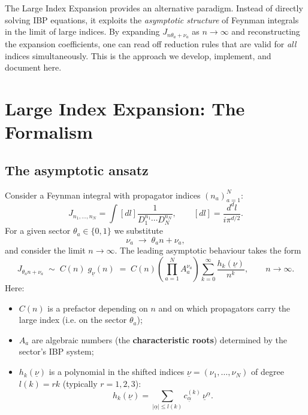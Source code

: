 \documentclass[12pt]{article}
\begin{document}
The Large Index Expansion provides an alternative paradigm.  Instead of directly
solving IBP equations, it exploits the \emph{asymptotic structure} of Feynman integrals
in the limit of large indices.  By expanding $J_{n\theta_a+\nu_a}$ as $n\to\infty$ and
reconstructing the expansion coefficients, one can read off reduction rules that are
valid for \emph{all} indices simultaneously.  This is the approach we develop,
implement, and document here.

\section{Large Index Expansion: The Formalism}\label{sec:formalism}

\subsection{The asymptotic ansatz}

Consider a Feynman integral with propagator indices $(n_a)_{a=1}^N$:
\[
  J_{n_1,\ldots,n_N}
  = \int [dl] \frac{1}{D_1^{n_1}\cdots D_N^{n_N}},
  \qquad [dl]=\frac{d^d l}{i\pi^{d/2}} .
\]
For a given sector $\theta_a\in\{0,1\}$ we substitute
\[
  \nu_a \;\to\; \theta_a n + \nu_a ,
\]
and consider the limit $n\to\infty$.  The leading asymptotic behaviour takes the form
\[
  J_{\theta_a n+\nu_a}
  \;\sim\; C(n)\;g_{\underline{\nu}}(n)
  \;=\; C(n)\!\left(\prod_{a=1}^{N}A_a^{\nu_a}\right)
     \sum_{k=0}^{\infty}\frac{h_k(\underline{\nu})}{n^{k}},
  \qquad n\to\infty .
\tag{2.1}\label{eq:ansatz}
\]
Here:
\begin{itemize}
  \item $C(n)$ is a prefactor depending on $n$ and on which propagators carry
        the large index (i.e. on the sector $\theta_a$);
  \item $A_a$ are algebraic numbers (the \textbf{characteristic roots}) determined by
        the sector's IBP system;
  \item $h_k(\underline{\nu})$ is a polynomial in the shifted indices
        $\underline{\nu}=(\nu_1,\ldots,\nu_N)$ of degree $l(k)=rk$
        (typically $r=1,2,3$):
        \[
          h_k(\underline{\nu})
          = \sum_{|\underline{\alpha}|\le l(k)}
            c_{\underline{\alpha}}^{(k)}\,
            \underline{\nu}^{\underline{\alpha}} .
        \tag{2.2}\label{eq:poly}
        \]
\end{itemize}
\end{document}
